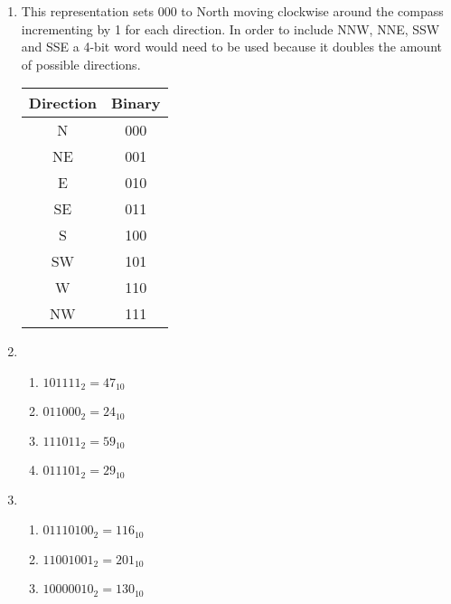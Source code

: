 \documentclass[a4paper]{article}
\begin{document}
\begin{enumerate}
        \item This representation sets 000 to North moving clockwise around the 
        compass incrementing by 1 for each direction. In order to include NNW, NNE, 
        SSW and SSE a 4-bit word would need to be used because it doubles the 
        amount of possible directions.\\
        \begin{tabular}{ c|c }
            Direction & Binary\\
            \hline
            N  & 000\\
            NE & 001\\
            E  & 010\\
            SE & 011\\
            S  & 100\\
            SW & 101\\
            W  & 110\\
            NW & 111\\


        \end{tabular}


        \item
        \begin{enumerate}[label=\alph*)]
            
            \item $101111_{2} = 47_{10}$

            \item $011000_{2} = 24_{10}$

            \item $111011_{2} = 59_{10}$
        
            \item $011101_{2} = 29_{10}$

        \end{enumerate}

        \item
        \begin{enumerate}[label=\alph*)]
            
            \item $01110100_{2} = 116_{10}$

            \item $11001001_{2} = 201_{10}$

            \item $10000010_{2} = 130_{10}$

        \end{enumerate}


\end{enumerate}
\end{document}
